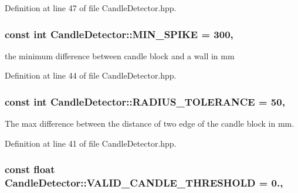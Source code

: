 Definition at line 47 of file Candle\-Detector.\-hpp.

\hypertarget{classCandleDetector_a9062a3c45b98c5d051082dbf4a285fd5}{
\subsubsection[{M\-I\-N\-\_\-\-S\-P\-I\-K\-E}]{\setlength{\rightskip}{0pt plus 5cm}const int Candle\-Detector\-::\-M\-I\-N\-\_\-\-S\-P\-I\-K\-E = 300\hspace{0.3cm}{\ttfamily [static]}, {\ttfamily [private]}}}\label{classCandleDetector_a9062a3c45b98c5d051082dbf4a285fd5}


the minimum difference between candle block and a wall in mm 



Definition at line 44 of file Candle\-Detector.\-hpp.

\hypertarget{classCandleDetector_ab3c96353ba6d64163cf5e44b1ce2aa9e}{
\subsubsection[{R\-A\-D\-I\-U\-S\-\_\-\-T\-O\-L\-E\-R\-A\-N\-C\-E}]{\setlength{\rightskip}{0pt plus 5cm}const int Candle\-Detector\-::\-R\-A\-D\-I\-U\-S\-\_\-\-T\-O\-L\-E\-R\-A\-N\-C\-E = 50\hspace{0.3cm}{\ttfamily [static]}, {\ttfamily [private]}}}\label{classCandleDetector_ab3c96353ba6d64163cf5e44b1ce2aa9e}


The max difference between the distance of two edge of the candle block in mm. 



Definition at line 41 of file Candle\-Detector.\-hpp.

\hypertarget{classCandleDetector_ac8aa00d0477ff096c344ec71d8ccdf82}{
\subsubsection[{V\-A\-L\-I\-D\-\_\-\-C\-A\-N\-D\-L\-E\-\_\-\-T\-H\-R\-E\-S\-H\-O\-L\-D}]{\setlength{\rightskip}{0pt plus 5cm}const float Candle\-Detector\-::\-V\-A\-L\-I\-D\-\_\-\-C\-A\-N\-D\-L\-E\-\_\-\-T\-H\-R\-E\-S\-H\-O\-L\-D = 0.\hspace{0.3cm}{\ttfamily [static]}, {\ttfamily [private]}}}\label{classCandleDetector_ac8aa00d0477ff096c344ec71d8ccdf82}


